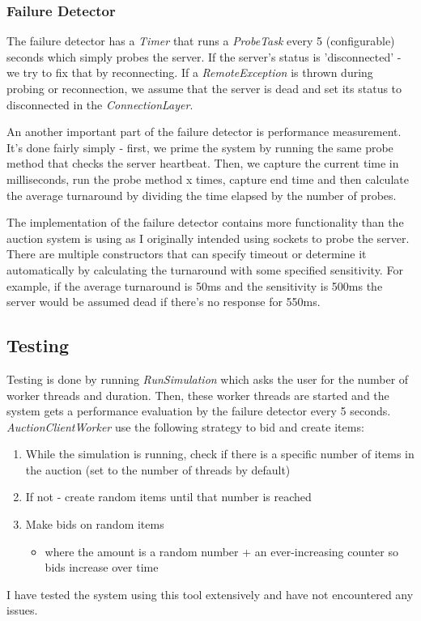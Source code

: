 \documentclass[10pt]{article}
\begin{document}
\subsubsection{Failure Detector}
The failure detector has a \textit{Timer} that runs a \textit{ProbeTask} every 5 (configurable) seconds which simply probes the server. If the server's status is 'disconnected' - we try to fix that by reconnecting. If a \textit{RemoteException} is thrown during probing or reconnection, we assume that the server is dead and set its status to disconnected in the \textit{ConnectionLayer}.\par An another important part of the failure detector is performance measurement. It's done fairly simply - first, we prime the system by running the same probe method that checks the server heartbeat. Then, we capture the current time in milliseconds, run the probe method x times, capture end time and then calculate the average turnaround by dividing the time elapsed by the number of probes.\par The implementation of the failure detector contains more functionality than the auction system is using as I originally intended using sockets to probe the server. There are multiple constructors that can specify timeout or determine it automatically by calculating the turnaround with some specified sensitivity. For example, if the average turnaround is 50ms and the sensitivity is 500ms the server would be assumed dead if there's no response for 550ms.
\subsection{Testing}
Testing is done by running \textit{RunSimulation} which asks the user for the number of worker threads and duration. Then, these worker threads are started and the system gets a performance evaluation by the failure detector every 5 seconds. \textit{AuctionClientWorker} use the following strategy to bid and create items: 
\begin{enumerate}
  \item While the simulation is running, check if there is a specific number of items in the auction (set to the number of threads by default)
  \item If not - create random items until that number is reached
  \item Make bids on random items 
  \begin{itemize}
    \item where the amount is a random number + an ever-increasing counter so bids increase over time
  \end{itemize}
\end{enumerate}
I have tested the system using this tool extensively and have not encountered any issues.
\pagebreak
\end{document}
